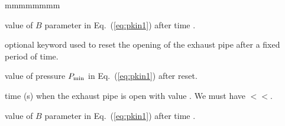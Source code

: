 \begin{ListeDeDescription}{mmmmmmmm}
\item[\dusa{bval1}] value of $B$ parameter in Eq.~(\ref{eq:pkin1}) after time .

\item[\moc{RESET}] optional keyword used to reset the opening of the exhaust pipe after a fixed period of time.

\item[\dusa{p3}] value of pressure $P_{\rm min}$ in Eq.~(\ref{eq:pkin1}) after reset.

\item[\dusa{tb2}] time (s) when the exhaust pipe is open with value . We must have $<$$<$.

\item[\dusa{bval2}] value of $B$ parameter in Eq.~(\ref{eq:pkin1}) after time .

\end{ListeDeDescription}
\clearpage
